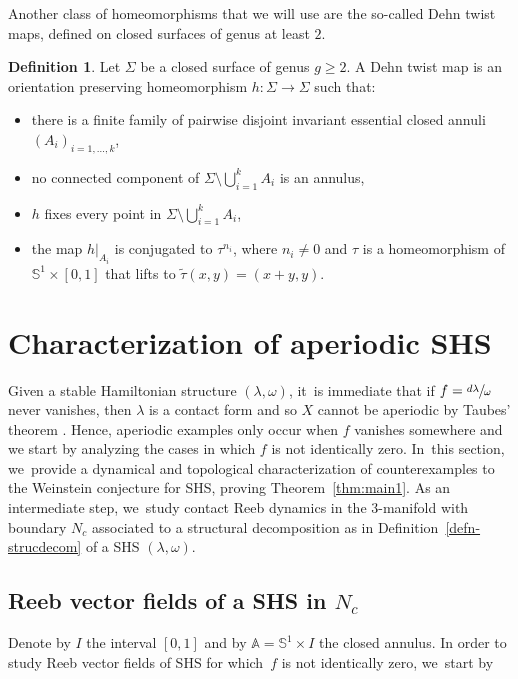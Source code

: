 \documentclass[10pt]{amsart}
\newcommand{\threemanifold}{$3$\nobreakdash-mani\-fold\xspace}
\theoremstyle{definition}
\newtheorem{defi}[theorem]{Definition}
\newcommand{\mS}{\mathbb{S}}
\begin{document}
Another class of homeomorphisms that we will use are the so-called Dehn twist maps, defined on closed surfaces of genus at least $2$.
\begin{defi}
Let $\Sigma$ be a closed surface of genus $g\geq 2$. A Dehn twist map is an orientation preserving homeomorphism $h:\Sigma \to \Sigma$ such that:
\begin{itemize}
\item
there is a finite family of pairwise disjoint invariant essential closed annuli $(A_i)_{i=1,\dots,k}$,
\item
no connected component of $\Sigma\setminus \bigcup_{i=1}^k A_i$ is an annulus,
\item
$h$ fixes every point in $\Sigma \setminus \bigcup_{i=1}^k A_i$,
\item
the map $h|_{A_i}$ is conjugated to $\tau^{n_i}$, where $n_i\neq 0$ and $\tau$ is a homeomorphism of $\mS^1\times [0,1]$ that lifts to $\widetilde \tau (x,y)=(x+y,y)$.
\end{itemize}
\end{defi}

\section{Characterization of aperiodic SHS}\label{s:Aper}

Given a stable Hamiltonian structure $(\lambda,\omega)$, it~is immediate that if $f=\sfrac{d\lambda}{\omega}$ never vanishes, then $\lambda$ is a contact form and so $X$ cannot be aperiodic by Taubes' theorem \cite{Taub}. Hence, aperiodic examples only occur when $f$ vanishes somewhere and we start by analyzing the cases in which $f$ is not identically zero. In~this section, we~provide a dynamical and topological characterization of counterexamples to the Weinstein conjecture for SHS, proving Theorem~\ref{thm:main1}. As an intermediate step, we~study contact Reeb dynamics in the \threemanifold with boundary $N_c$ associated to a structural decomposition as in Definition~\ref{defn-strucdecom} of a SHS $(\lambda,\omega)$.

\subsection{Reeb vector fields of a SHS in $N_c$}

Denote by $I$ the interval $[0,1]$ and by $\mathbb{A}=\mS^1\times I$ the closed annulus.
In order to study Reeb vector fields of SHS for which~$f$ is not identically zero, we~start by
\end{document}
